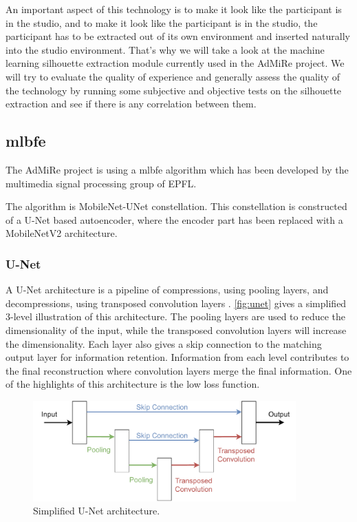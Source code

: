 An important aspect of this technology is to make it look like the participant is in the studio, and to make it look like the participant is in the studio, the participant has to be extracted out of its own environment and inserted naturally into the studio environment. That's why we will take a look at the machine learning silhouette extraction module currently used in the AdMiRe project. We will try to evaluate the quality of experience and generally assess the quality of the technology by running some subjective and objective tests on the silhouette extraction and see if there is any correlation between them. 


\subsection{\acrlong{mlbfe}}\label{sec:mlbfe}
The AdMiRe project is using a \acrlong{mlbfe} algorithm which has been developed by the multimedia signal processing group of EPFL. 

The algorithm is MobileNet-UNet constellation. This constellation is constructed of a U-Net based autoencoder, where the encoder part has been replaced with a MobileNetV2 architecture. 

\subsubsection{U-Net}\label{sec:unet}
A U-Net architecture is a pipeline of compressions, using pooling layers, and decompressions, using transposed convolution layers \cite{ronneberger2015unet}. \autoref{fig:unet} gives a simplified 3-level illustration of this architecture. The pooling layers are used to reduce the dimensionality of the input, while the transposed convolution layers will increase the dimensionality. Each layer also gives a skip connection to the matching output layer for information retention. Information from each level contributes to the final reconstruction where convolution layers merge the final information. One of the highlights of this architecture is the low loss function.  

\begin{figure}[H]
  \centering
  \includegraphics[width=0.9\textwidth]{img/ML/unet.pdf}
  \caption{Simplified U-Net architecture. }
  \label{fig:unet}
\end{figure}

